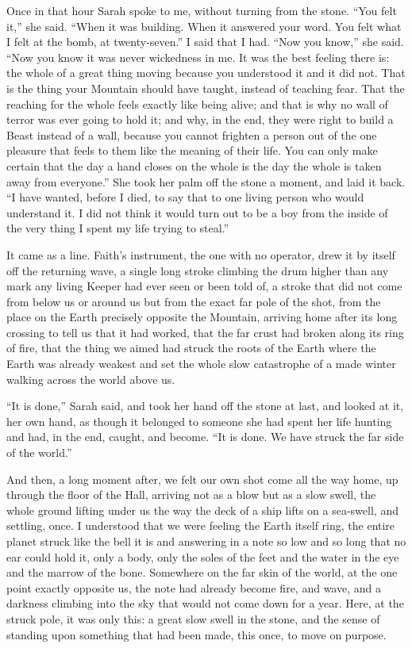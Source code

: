 Once in that hour Sarah spoke to me, without turning from the stone. ``You felt it,'' she said. ``When it was building. When it answered your word. You felt what I felt at the bomb, at twenty-seven.'' I said that I had. ``Now you know,'' she said. ``Now you know it was never wickedness in me. It was the best feeling there is: the whole of a great thing moving because you understood it and it did not. That is the thing your Mountain should have taught, instead of teaching fear. That the reaching for the whole feels exactly like being alive; and that is why no wall of terror was ever going to hold it; and why, in the end, they were right to build a Beast instead of a wall, because you cannot frighten a person out of the one pleasure that feels to them like the meaning of their life. You can only make certain that the day a hand closes on the whole is the day the whole is taken away from everyone.'' She took her palm off the stone a moment, and laid it back. ``I have wanted, before I died, to say that to one living person who would understand it. I did not think it would turn out to be a boy from the inside of the very thing I spent my life trying to steal.''\par

It came as a line. Faith's instrument, the one with no operator, drew it by itself off the returning wave, a single long stroke climbing the drum higher than any mark any living Keeper had ever seen or been told of, a stroke that did not come from below us or around us but from the exact far pole of the shot, from the place on the Earth precisely opposite the Mountain, arriving home after its long crossing to tell us that it had worked, that the far crust had broken along its ring of fire, that the thing we aimed had struck the roots of the Earth where the Earth was already weakest and set the whole slow catastrophe of a made winter walking across the world above us.\par

``It is done,'' Sarah said, and took her hand off the stone at last, and looked at it, her own hand, as though it belonged to someone she had spent her life hunting and had, in the end, caught, and become. ``It is done. We have struck the far side of the world.''\par

And then, a long moment after, we felt our own shot come all the way home, up through the floor of the Hall, arriving not as a blow but as a slow swell, the whole ground lifting under us the way the deck of a ship lifts on a sea-swell, and settling, once. I understood that we were feeling the Earth itself ring, the entire planet struck like the bell it is and answering in a note so low and so long that no ear could hold it, only a body, only the soles of the feet and the water in the eye and the marrow of the bone. Somewhere on the far skin of the world, at the one point exactly opposite us, the note had already become fire, and wave, and a darkness climbing into the sky that would not come down for a year. Here, at the struck pole, it was only this: a great slow swell in the stone, and the sense of standing upon something that had been made, this once, to move on purpose.\par

